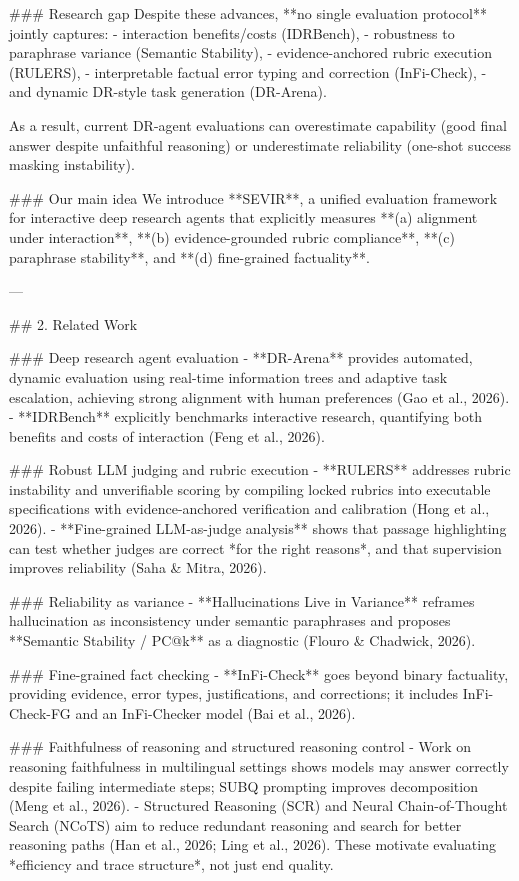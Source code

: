 ### Research gap  
Despite these advances, **no single evaluation protocol** jointly captures:
- interaction benefits/costs (IDRBench),
- robustness to paraphrase variance (Semantic Stability),
- evidence-anchored rubric execution (RULERS),
- interpretable factual error typing and correction (InFi-Check),
- and dynamic DR-style task generation (DR-Arena).

As a result, current DR-agent evaluations can overestimate capability (good final answer despite unfaithful reasoning) or underestimate reliability (one-shot success masking instability).

### Our main idea  
We introduce **SEVIR**, a unified evaluation framework for interactive deep research agents that explicitly measures **(a) alignment under interaction**, **(b) evidence-grounded rubric compliance**, **(c) paraphrase stability**, and **(d) fine-grained factuality**.

---

## 2. Related Work  

### Deep research agent evaluation  
- **DR-Arena** provides automated, dynamic evaluation using real-time information trees and adaptive task escalation, achieving strong alignment with human preferences (Gao et al., 2026).  
- **IDRBench** explicitly benchmarks interactive research, quantifying both benefits and costs of interaction (Feng et al., 2026).  

### Robust LLM judging and rubric execution  
- **RULERS** addresses rubric instability and unverifiable scoring by compiling locked rubrics into executable specifications with evidence-anchored verification and calibration (Hong et al., 2026).  
- **Fine-grained LLM-as-judge analysis** shows that passage highlighting can test whether judges are correct *for the right reasons*, and that supervision improves reliability (Saha & Mitra, 2026).

### Reliability as variance  
- **Hallucinations Live in Variance** reframes hallucination as inconsistency under semantic paraphrases and proposes **Semantic Stability / PC@k** as a diagnostic (Flouro & Chadwick, 2026).

### Fine-grained fact checking  
- **InFi-Check** goes beyond binary factuality, providing evidence, error types, justifications, and corrections; it includes InFi-Check-FG and an InFi-Checker model (Bai et al., 2026).

### Faithfulness of reasoning and structured reasoning control  
- Work on reasoning faithfulness in multilingual settings shows models may answer correctly despite failing intermediate steps; SUBQ prompting improves decomposition (Meng et al., 2026).  
- Structured Reasoning (SCR) and Neural Chain-of-Thought Search (NCoTS) aim to reduce redundant reasoning and search for better reasoning paths (Han et al., 2026; Ling et al., 2026). These motivate evaluating *efficiency and trace structure*, not just end quality.

